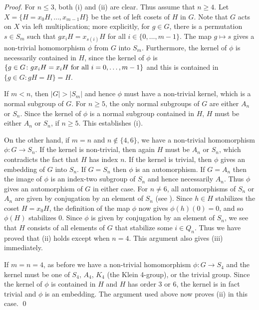 \documentclass{llncs}
\begin{document}
\begin{proof} For $n\le 3$, both (i) and (ii) are clear.  Thus assume that $n\ge 4$.  
Let $X=\{H=x_0H,\dots ,x_{m-1}H\}$ be the set of left cosets of $H$ in $G$.   Note that $G$ acts on $X$ via left multiplication; more explicitly,  for $g\in G$, there is a permutation $s\in S_m$ such that $gx_i H = x_{s(i)}H$ for all $i\in \{0,\dots ,m-1\}$.  The map $g\mapsto s$ gives a non-trivial homomorphism $\phi$ from $G$ into $S_m$.  Furthermore, the kernel of $\phi$ is necessarily contained in $H$, since the kernel of $\phi$ is $\{g\in G\colon gx_iH=x_iH~{\rm for~all~}i=0,\dots ,m-1\}$ and this is contained in $\{g\in G\colon gH=H\}=H$.    

If $m<n$, then $|G|>|S_m|$ and hence $\phi$ must have a non-trivial kernel, which is a normal subgroup of $G$.  For $n\ge 5$, the only normal subgroups of $G$ are either $A_n$ or $S_n$. Since the kernel of $\phi$ is a normal subgroup contained in $H$,  $H$ must be either $A_n$ or $S_n$, if $n\ge 5$.   This establishes (i).

On the other hand, if $m=n$ and $n\not\in \{4,6\}$,  we have a non-trivial homomorphism $\phi\colon G\to S_n$.  If the kernel is non-trivial, then  again $H$ must be $A_n$ or $S_n$, which contradicts the fact that $H$ has index $n$.  If the kernel is trivial, then $\phi$ gives an embedding of $G$ into $S_n$.  If $G=S_n$ then $\phi$ is an automorphism.  If $G=A_n$ then the image of $\phi$ is an index-two subgroup of $S_n$ and hence necessarily $A_n$.  Thus $\phi$ gives an automorphism of $G$ in either case.  For $n\neq 6$, all automorphisms of $S_n$ or $A_n$ are given by conjugation by an element of $S_n$ (see \cite[Chapter 3.2]{Suz82}).  Since $h \in H$ stabilizes the coset $H=x_0H$, the definition of the map $\phi$ now gives $\phi(h)(0)=0$, and so $\phi(H)$ stabilizes 0.  Since $\phi$ is given by conjugation by an element of $S_n$, we see that $H$ consists of all elements of $G$ that stabilize some $i\in Q_n$.  Thus we have proved that (ii) holds except when $n=4$.  This argument also gives (iii) immediately.  

If $m=n=4$, as before we have a non-trivial homomorphism $\phi:G\to S_4$ and the kernel must be one of $S_4$, $A_4$, $K_4$ (the Klein 4-group), or the trivial group.  Since the kernel of $\phi$ is contained in $H$ and $H$ has order $3$ or $6$,  the kernel is in fact trivial and $\phi$ is an embedding.   The argument used above now proves (ii) in this case.  
\qed  
\end{proof}
\end{document}
